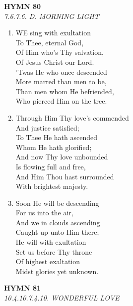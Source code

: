 \newpage
\begin{center}
    {\Large \textbf{HYMN 80}}
    \\
    \textit{7.6.7.6. D. MORNING LIGHT}
\end{center}
\vspace{1em}

\begin{enumerate}
    \item WE sing with exultation \\
        To Thee, eternal God, \\
        Of Him who's Thy salvation, \\
        Of Jesus Christ our Lord. \\
        'Twas He who once descended \\
        More marred than men to be, \\
        Than men whom He befriended, \\
        Who pierced Him on the tree.

    \item Through Him Thy love's commended \\
        And justice satisfied; \\
        To Thee He hath ascended \\
        Whom He hath glorified; \\
        And now Thy love unbounded \\
        Is flowing full and free, \\
        And Him Thou hast surrounded \\
        With brightest majesty.

    \item Soon He will be descending \\
        For us into the air, \\
        And we in clouds ascending \\
        Caught up unto Him there; \\
        He will with exultation \\
        Set us before Thy throne \\
        Of highest exaltation \\
        Midst glories yet unknown.

\end{enumerate}

\newpage
\begin{center}
    {\Large \textbf{HYMN 81\textdagger{}}}
    \\
    \textit{10.4.10.7.4.10. WONDERFUL LOVE}
\end{center}
\vspace{1em}

